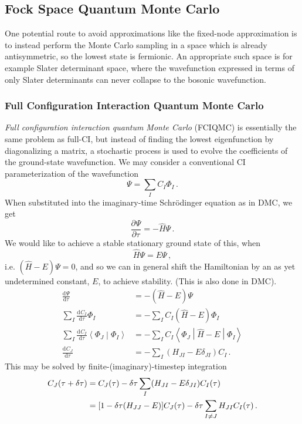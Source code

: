 \documentclass{article}
\theoremstyle{plain}\theoremheaderfont{\normalfont\itshape}\theorembodyfont{\rmfamily}\theoremseparator{.}\newtheorem*{rem}{Remark}\newtheorem*{ex}{Example}\newtheorem*{proof}{Proof}\newtheorem*{altp}{Alternative proof}
\theoremstyle{plain}\theoremheaderfont{\normalfont\bfseries}\theorembodyfont{\rmfamily}\theoremseparator{.}\newtheorem{thm}{Theorem}[section]\newtheorem{lem}[thm]{Lemma}\newtheorem{prop}[thm]{Proposition}\newtheorem*{cor}{Corollary}\newtheorem{defn}[thm]{Definition}\newtheorem{clm}[thm]{Claim}\newtheorem{clminproof}{Claim}
\theoremstyle{break}\theoremheaderfont{\normalfont\itshape}\theorembodyfont{\rmfamily}\theoremseparator{.\medskip}\newtheorem*{proofskip}{Proof}\newtheorem*{exs}{Examples}\newtheorem*{rems}{Remarks}
\theoremstyle{break}\theoremheaderfont{\normalfont\bfseries}\theorembodyfont{\rmfamily}\theoremseparator{.\medskip}\newtheorem{lemskip}[thm]{Lemma}\newtheorem{defnskip}[thm]{Definition}\newtheorem{propskip}[thm]{Proposition}\newtheorem{thmskip}[thm]{Theorem}
\numberwithin{equation}{section}
\newcommand{\dv}[3][]{\frac{\mathrm{d}^{#1} #2}{{\mathrm{d} #3}^{#1}}}
\newcommand{\pdv}[3][]{\frac{\partial^{#1} #2}{{\partial #3}^{#1}}}
\newcommand{\braket}[2]{\left\langle #1 \middle| #2 \right\rangle}
\newcommand{\mel}[3]{\left\langle #1 \middle| #2 \middle| #3 \right\rangle}
\begin{document}
    \subsection{Fock Space Quantum Monte Carlo}
    One potential route to avoid approximations like the fixed-node approximation is to instead perform the Monte Carlo sampling in a space which is already antisymmetric, so the lowest state is fermionic. An appropriate such space is for example Slater determinant space, where the wavefunction expressed in terms of only Slater determinants can never collapse to the bosonic wavefunction.
    \subsubsection{Full Configuration Interaction Quantum Monte Carlo}\label{Chap:FCIQMC}
    \textit{Full configuration interaction quantum Monte Carlo} (FCIQMC) is essentially the same problem as full-CI, but instead of finding the lowest eigenfunction by diagonalizing a matrix, a stochastic process is used to evolve the coefficients of the ground-state wavefunction. We may consider a conventional CI parameterization of the wavefunction
    \begin{equation}
        \Psi=\sum_I C_I\Phi_I\,.
    \end{equation}
    When substituted into the imaginary-time Schr\"{o}dinger equation as in DMC, we get
    \begin{equation}
        \pdv{\Psi}{\tau}=-\hat{H}\Psi\,.
    \end{equation}
    We would like to achieve a stable stationary ground state of this, when
    \begin{equation}
        \hat{H}\Psi=E\Psi\,,
    \end{equation}
    i.e. \((\hat{H}-E)\Psi=0\), and so we can in general shift the Hamiltonian by an as yet undetermined constant, \(E\), to achieve stability. (This is also done in DMC).
    \begin{align}
        \dv{\Psi}{\tau}&=-(\hat{H}-E)\Psi\\
        \sum_I\dv{C_I}{\tau}\Phi_I&=-\sum_I C_I(\hat{H}-E)\Phi_I\\
        \sum_I\dv{C_I}{\tau}\braket{\Phi_J}{\Phi_I}&=-\sum_I C_I\mel{\Phi_J}{\hat{H}-E}{\Phi_I}\\
        \dv{C_J}{\tau}&=-\sum_I(H_{JI}-E\delta_{JI})C_I\,.
    \end{align}
    This may be solved by finite-(imaginary)-timestep integration
    \begin{align}
        C_J(\tau+\delta\tau)&=C_J(\tau)-\delta\tau\sum_I(H_{JI}-E\delta_{JI})C_I(\tau)\notag\\
        &=[1-\delta\tau(H_{JJ}-E)]C_J(\tau)-\delta\tau\sum_{I\ne J}H_{JI}C_I(\tau)\,. \label{FCI_QMC}
    \end{align}
\end{document}

